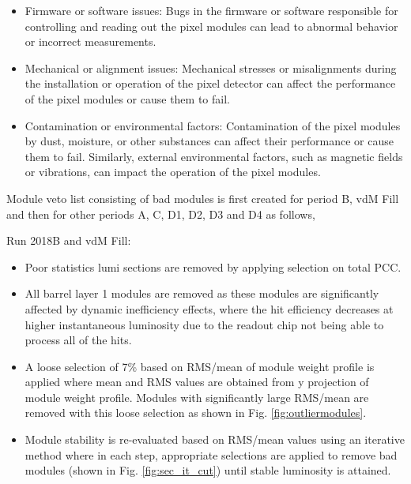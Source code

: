 \begin{itemize}
\item Firmware or software issues: Bugs in the firmware or software responsible for controlling and reading out the pixel modules can lead to abnormal behavior or incorrect measurements.

\item Mechanical or alignment issues: Mechanical stresses or misalignments during the installation or operation of the pixel detector can affect the performance of the pixel modules or cause them to fail.

\item Contamination or environmental factors: Contamination of the pixel modules by dust, moisture, or other substances can affect their performance or cause them to fail. Similarly, external environmental factors, such as magnetic fields or vibrations, can impact the operation of the pixel modules.

\end{itemize}


Module veto list consisting of bad modules is first created for period B, vdM Fill and then for other periods A, C, D1, D2, D3 and D4 as follows, 

Run 2018B and vdM Fill:
\begin{itemize}

\item Poor statistics lumi sections are removed by applying selection on total PCC. %

\item All barrel layer 1 modules are removed as these modules are significantly affected by dynamic inefficiency effects, where the hit efficiency decreases at higher instantaneous luminosity due to the readout chip not being able to process all of the hits.
  
\item A loose selection of 7\% based on RMS/mean of module weight profile is applied where mean and RMS values are obtained from y projection of module weight profile. Modules with significantly large RMS/mean are removed with this loose selection as shown in Fig. \ref{fig:outliermodules}. 

\item Module stability is re-evaluated based on RMS/mean values using an iterative method where in each step, appropriate selections are applied to remove bad modules (shown in Fig. \ref{fig:sec_it_cut}) until stable luminosity is attained.                                                      
\end{itemize}

